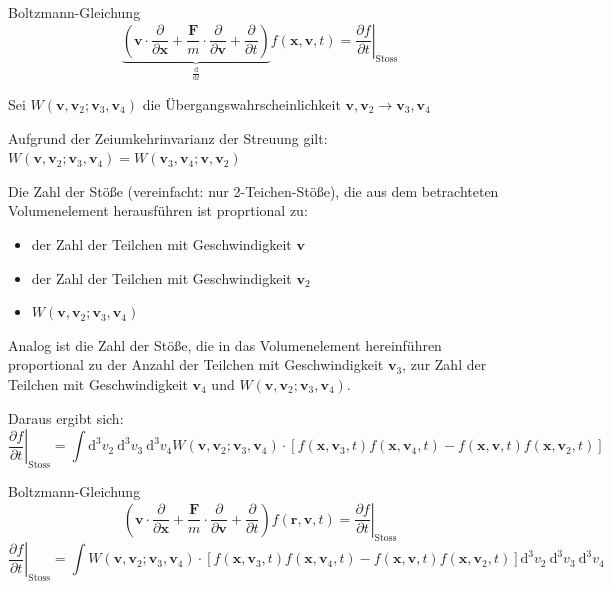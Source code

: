 \documentclass[ngerman]{article}
\begin{document}
\begin{section}{Boltzmann-Gleichung}
     $$   \underbrace{\left( \boldsymbol{v} \cdot \frac{\partial}{\partial \boldsymbol{x}} + \frac{\boldsymbol{F}}{m} \cdot \frac{\partial}{\partial \boldsymbol{v}}+\frac{\partial}{\partial t}\right)}_{\frac{\text{d}}{\text{d}t}} f(\boldsymbol{x}, \boldsymbol{v}, t) =  \left.\frac{\partial f}{\partial t}\right|_\mathrm{Stoss}
    $$



Sei $W(\boldsymbol{v},\boldsymbol{v}_2;\boldsymbol{v}_3,\boldsymbol{v}_4)$ die Übergangswahrscheinlichkeit $ \boldsymbol{v},\boldsymbol{v}_2  \rightarrow \boldsymbol{v}_3,\boldsymbol{v}_4$


Aufgrund der Zeiumkehrinvarianz der Streuung gilt: $W(\boldsymbol{v},\boldsymbol{v}_2;\boldsymbol{v}_3,\boldsymbol{v}_4)= W(\boldsymbol{v}_3,\boldsymbol{v}_4; \boldsymbol{v},\boldsymbol{v}_2)$


Die Zahl der Stöße (vereinfacht: nur 2-Teichen-Stöße), die aus dem betrachteten Volumenelement herausführen ist proprtional zu:
\begin{itemize}


\item
der Zahl der Teilchen mit Geschwindigkeit $\boldsymbol{v}$

\item
der  Zahl der Teilchen mit Geschwindigkeit $\boldsymbol{v}_2$
\item
$W(\boldsymbol{v},\boldsymbol{v}_2;\boldsymbol{v}_3,\boldsymbol{v}_4)$
\end{itemize}
Analog ist die Zahl der Stöße, die in das Volumenelement hereinführen proportional zu der Anzahl der Teilchen mit Geschwindigkeit $\boldsymbol{v}_3$, zur Zahl der Teilchen mit Geschwindigkeit $\boldsymbol{v}_4$ und $W(\boldsymbol{v},\boldsymbol{v}_2;\boldsymbol{v}_3,\boldsymbol{v}_4)$.



Daraus ergibt sich:
$$ \left.\frac{\partial f}{\partial t}\right|_\mathrm{Stoss} =  \int \text{d}^3v_2 \ \text{d}^3v_3 \ \text{d}^3 v_4 W(\boldsymbol{v},\boldsymbol{v}_2;\boldsymbol{v}_3,\boldsymbol{v}_4) \cdot \left[ f(\boldsymbol{x},\boldsymbol{v}_3,t)f(\boldsymbol{x},\boldsymbol{v}_4,t) - f(  \boldsymbol{x}, \boldsymbol{v},t)f(\boldsymbol{x},\boldsymbol{v}_2,t) \right]  $$



Boltzmann-Gleichung 
	$$ \left( \boldsymbol{v} \cdot \frac{\partial}{\partial \boldsymbol{x}} + \frac{\boldsymbol{F}}{m} \cdot \frac{\partial}{\partial \boldsymbol{v}}+\frac{\partial}{\partial t}\right) f(\boldsymbol{r}, \boldsymbol{v}, t) =  \left.\frac{\partial f}{\partial t}\right|_\mathrm{Stoss}     $$ $$ \left.\frac{\partial f}{\partial t}\right|_\mathrm{Stoss} =  \int W(\boldsymbol{v},\boldsymbol{v}_2;\boldsymbol{v}_3,\boldsymbol{v}_4) \cdot\left[ f(\boldsymbol{x},\boldsymbol{v}_3,t)f(\boldsymbol{x},\boldsymbol{v}_4,t) - f(  \boldsymbol{x}, \boldsymbol{v},t)f(\boldsymbol{x},\boldsymbol{v}_2,t) \right] \text{d}^3v_2 \ \text{d}^3v_3 \ \text{d}^3 v_4 $$

  


 
 
\end{section}
\end{document}
